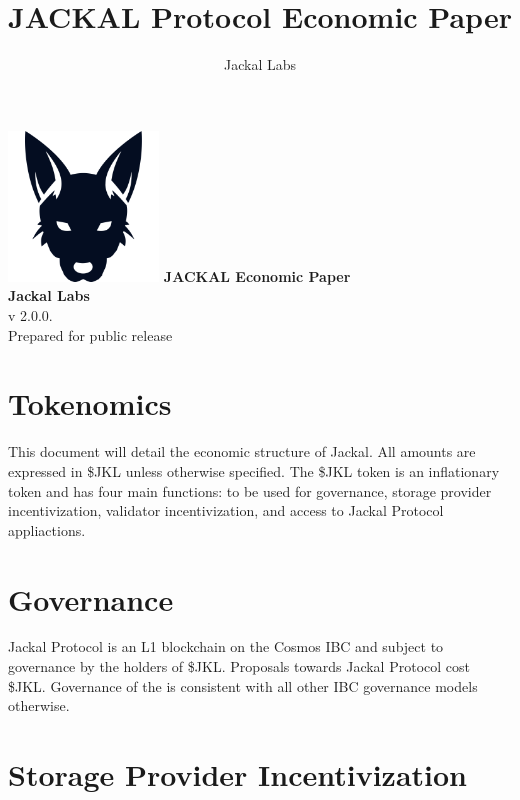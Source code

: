 \documentclass[11pt, nofootinbib]{article}
\title{JACKAL Protocol Economic Paper}
\author{Jackal Labs}
\begin{document}
\begin{titlepage}
    \centering
    \vspace*{3cm}
    \includegraphics[width=4cm]{jklimage.png} %
    \vskip2cm
    {\bfseries\Large
        JACKAL Economic Paper\\
        \vskip0.5cm
    }    
   {\bfseries
        Jackal Labs\\
    }    
    \vfill
    v 2.0.0. \\
    Prepared for public release
\end{titlepage}
\newpage
\tableofcontents
\newpage



\section{Tokenomics}

This document will detail the economic structure of Jackal. All amounts are expressed in \$JKL unless otherwise specified.
The \$JKL token is an inflationary token and has four main functions: to be used for governance, storage provider
incentivization, validator incentivization, and access to Jackal Protocol appliactions. 

\section{Governance}

Jackal Protocol is an L1 blockchain on the Cosmos IBC and subject to governance
by the holders of \$JKL. Proposals towards Jackal Protocol cost \$JKL. Governance
of the is consistent with all other IBC governance models otherwise.


\section{Storage Provider Incentivization}
\end{document}
